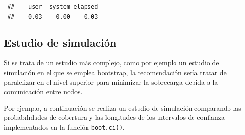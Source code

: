 \documentclass[
  10pt,
]{book}
\theoremstyle{break}
\theoremstyle{nonumberplain}
\begin{document}
\begin{verbatim}
 ##    user  system elapsed 
 ##    0.03    0.00    0.03
\end{verbatim}

\hypertarget{estudio-sim-boot}{%
\subsection{Estudio de simulación}\label{estudio-sim-boot}}

Si se trata de un estudio más complejo, como por ejemplo un estudio de simulación en el que se emplea bootstrap, la recomendación sería tratar de paralelizar en el nivel superior para minimizar la sobrecarga debida a la comunicación entre nodos.

Por ejemplo, a continuación se realiza un estudio de simulación comparando las probabilidades de cobertura y las longitudes de los intervalos de confianza implementados en la función \texttt{boot.ci()}.
\end{document}
